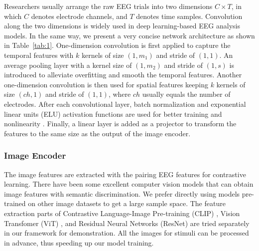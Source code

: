 Researchers usually arrange the raw EEG trials into two dimensions \begin{math}C\times T\end{math}, in which \begin{math}C\end{math} denotes electrode channels, and \begin{math}T\end{math} denotes time samples.
Convolution along the two dimensions is widely used in deep learning-based EEG analysis models.
In the same way, we present a very concise network architecture as shown in Table~\ref{tab:1}.
One-dimension convolution is first applied to capture the temporal features with \(k\) kernels of size \((1, m_1)\) and stride of \((1, 1)\).
An average pooling layer with a kernel size of \((1, m_2)\) and stride of \((1, s)\) is introduced to alleviate overfitting and smooth the temporal features.
Another one-dimension convolution is then used for spatial features keeping \(k\) kernels of size \((ch, 1)\) and stride of \((1, 1)\), where \(ch\) usually equals the number of electrodes.
After each convolutional layer, batch normalization and exponential linear units (ELU) activation functions are used for better training and nonlinearity \citep{clevert2016fast}.
Finally, a linear layer is added as a projector to transform the features to the same size as the output of the image encoder.

\subsubsection{Image Encoder}
The image features are extracted with the pairing EEG features for contrastive learning.
There have been some excellent computer vision models that can obtain image features with semantic discrimination.
We prefer directly using models pre-trained on other image datasets to get a large sample space. 
The feature extraction parts of Contrastive Language-Image Pre-training (CLIP) \citep{radford2021learning}, Vision Transfomer (ViT) \citep{dosovitskiy2021image}, and Residual Neural Networks (ResNet) \citep{he2016deepa} are tried separately in our framework for demonstration.
All the images for stimuli can be processed in advance, thus speeding up our model training.

